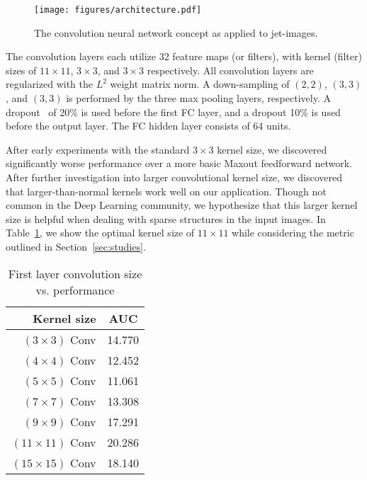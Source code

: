 \begin{figure}[!htbp]
  \centering
  \texttt{[image: figures/architecture.pdf]}
  \caption{The convolution neural network concept as applied to jet-images.}
  \label{fig:arch}
\end{figure}

The convolution layers each utilize 32 feature maps (or filters), with kernel (filter) sizes of $11\times 11$, $3\times 3$, and $3\times 3$ respectively.  All convolution layers are regularized with the $L^{2}$ weight matrix norm.  A down-sampling of $(2, 2)$, $(3, 3)$, and $(3, 3)$ is performed by the three max pooling layers, respectively.  A dropout~\cite{dropout:and:LRN} of 20\% is used before the first FC layer, and a dropout 10\% is used before the output layer.  The FC hidden layer consists of 64 units.

After early experiments with the standard $3\times 3$ kernel size, we discovered significantly worse performance over a more basic Maxout \cite{maxout:goodfellow} feedforward network. After further investigation into larger convolutional kernel size, we discovered that larger-than-normal kernels work well on our application. Though not common in the Deep Learning community, we hypothesize that this larger kernel size is helpful when dealing with sparse structures in the input images. In Table~\ref{tab:kernelsize}, we show the optimal kernel size of $11\times11$ while considering the metric outlined in Section~\ref{sec:studies}.

\begin{table}[h!]
  \centering
  \begin{tabular}{r|c}
    \bfseries Kernel size & \bfseries AUC \\ 
    \hline
    $(3 \times 3)$ Conv & 14.770 \\
    \hline
    $(4 \times 4)$ Conv & 12.452 \\
    \hline
    $(5 \times 5)$ Conv & 11.061 \\
    \hline
    $(7 \times 7)$ Conv & 13.308 \\
    \hline
    $(9 \times 9)$ Conv & 17.291 \\
    \hline
    $(11 \times 11)$ Conv & 20.286 \\
    \hline
    $(15 \times 15)$ Conv & 18.140 \\
  \end{tabular}
  \caption{First layer convolution size vs. performance}
  \label{tab:kernelsize}
\end{table}

